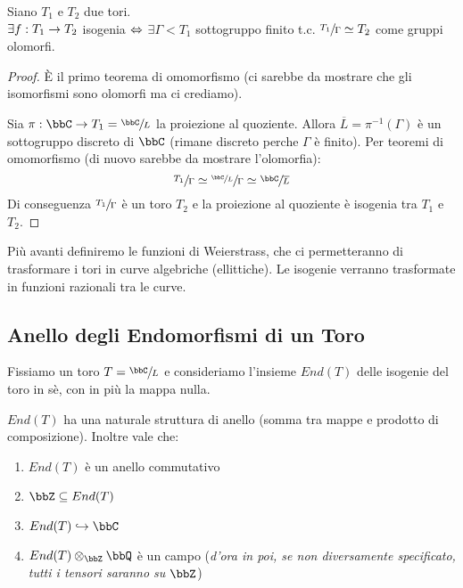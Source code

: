 \begin{proposizione}
Siano $T_{1}$ e $T_{2}$ due tori.\\
$\exists f:T_{1} \rightarrow T_{2}$ isogenia $\Leftrightarrow$ $\exists \Gamma < T_{1}$ sottogruppo finito t.c. $\sfrac{T_{1}}{\Gamma} \simeq T_{2}$ come gruppi olomorfi. 
\end{proposizione}
\begin{proof}
  \fbox{$\Rar$} È il primo teorema di omomorfismo (ci sarebbe da mostrare che gli isomorfismi sono olomorfi ma ci crediamo).
  
  \fbox{$\Leftarrow$} Sia $\pi:\bbC \rar T_{1} = \sfrac{\bbC}{L}$ la proiezione al quoziente. Allora $\overline{L}=\pi^{-1}(\Gamma)$ è un sottogruppo discreto di $\bbC$ (rimane discreto perche $\Gamma$ è finito). Per teoremi di omomorfismo (di nuovo sarebbe da mostrare l'olomorfia):
$$\sfrac{T_{1}}{\Gamma} \simeq \sfrac{\sfrac{\bbC}{L}}{\Gamma} \simeq \sfrac{\bbC}{\overline{L}}$$
Di conseguenza $\sfrac{T_{1}}{\Gamma}$ è un toro $T_{2}$ e la proiezione al quoziente è isogenia tra $T_{1}$ e $T_{2}$.
\end{proof}

Più avanti definiremo le funzioni di Weierstrass, che ci permetteranno di trasformare i tori in curve algebriche (ellittiche). Le isogenie verranno trasformate in funzioni razionali tra le curve.

\subsection{Anello degli Endomorfismi di un Toro}

Fissiamo un toro $T=\sfrac{\bbC}{L}$ e consideriamo l'insieme $End(T)$ delle isogenie del toro in sè, con in più la mappa nulla.

\begin{proposizione} $End(T)$ ha una naturale struttura di anello (somma tra mappe e prodotto di composizione). Inoltre vale che:
\begin{enumerate}
\item $End(T)$ è un anello commutativo
\item $\bbZ \subseteq End(T)$
\item $End(T) \hookrightarrow \bbC$
\item $End(T) \otimes_{\bbZ} \bbQ$ è un campo ({\it d'ora in poi, se non diversamente specificato, tutti i tensori saranno su $\bbZ$})
\end{enumerate}
\end{proposizione}


